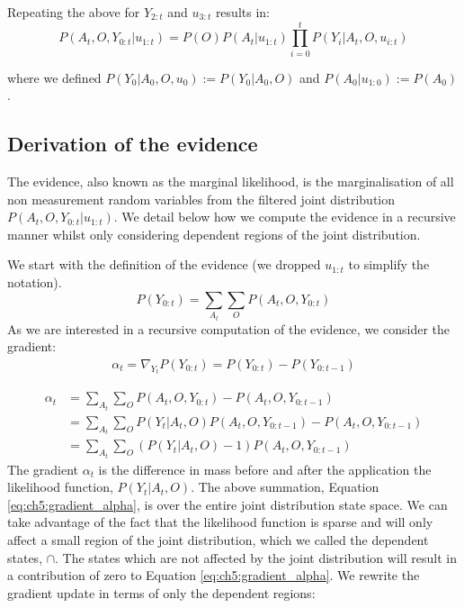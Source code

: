 Repeating the above for $Y_{2:t}$ and $u_{3:t}$ results in:
\begin{equation}
 P(A_t,O,Y_{0:t}|u_{1:t}) = P(O)P(A_t|u_{1:t}) \prod_{i=0}^{t} P(Y_i|A_t,O,u_{i:t})
\end{equation}

where we defined $P(Y_0|A_0,O,u_{0}) := P(Y_0|A_0,O)$ and $P(A_0|u_{1:0}) := P(A_0)$.

\subsection{Derivation of the evidence}\label{appendix:evidence}


The evidence, also known as the marginal likelihood, is the marginalisation of all non measurement random variables from 
the filtered joint distribution $P(A_t,O,Y_{0:t}|u_{1:t})$. We detail below how we compute the evidence in a recursive 
manner whilst only considering dependent regions of the joint distribution.

We start with the definition of the evidence (we dropped $u_{1:t}$ to simplify the notation).
\begin{equation}\label{eq:ch5:numerator}
 P(Y_{0:t}) = \sum\limits_{A_t}\sum\limits_{O} P(A_t,O,Y_{0:t}) 
\end{equation}
As we are interested in a recursive computation of the evidence, we consider the gradient:
\begin{align}
  \alpha_t = \nabla_{Y_t}P(Y_{0:t}) =  P(Y_{0:t}) - P(Y_{0:t-1})
\end{align}

\begin{align}
 \alpha_t  &= \sum\limits_{A_t}\sum\limits_{O} P(A_t,O,Y_{0:t}) - P(A_t,O,Y_{0:t-1})  \\
	   &= \sum\limits_{A_t}\sum\limits_{O} P(Y_t|A_t,O)P(A_t,O,Y_{0:t-1}) - P(A_t,O,Y_{0:t-1}) \\
	   &= \sum\limits_{A_t}\sum\limits_{O} (P(Y_t|A_t,O) - 1)P(A_t,O,Y_{0:t-1}) \label{eq:ch5:gradient_alpha}
\end{align}
The gradient $\alpha_t$ is the difference in mass before and after the application the likelihood function, $P(Y_t|A_t,O)$. The above 
summation, Equation \ref{eq:ch5:gradient_alpha}, is over the entire joint distribution state space. We can take advantage of the fact 
that the likelihood function is sparse and will only affect a small region of the joint distribution, which we called the dependent states, $\cap$.
The states which are not affected by the joint distribution will result in a contribution of zero to Equation \ref{eq:ch5:gradient_alpha}. We 
rewrite the gradient update in terms of only the dependent regions:

